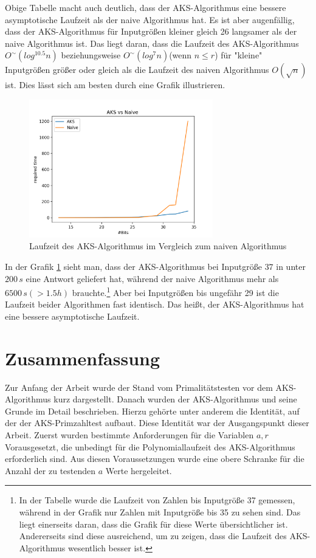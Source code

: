 \documentclass[12pt,oneside]{article}
\theoremstyle{remark}
\theoremstyle{definition}
\begin{document}
Obige Tabelle macht auch deutlich, dass der AKS-Algorithmus eine bessere asymptotische Laufzeit als der naive Algorithmus hat. Es ist aber augenfällig, dass der AKS-Algorithmus für Inputgrößen kleiner gleich 26 langsamer als der naive Algorithmus ist. Das liegt daran, dass die Laufzeit des AKS-Algorithmus $O^{\sim}(log^{10.5}n)$ beziehungsweise $O^{\sim}(log^7n)$(wenn $n \leq r$) für "kleine" $ $ Inputgrößen größer oder gleich als die Laufzeit des naiven Algorithmus $O(\sqrt{n})$ ist. Dies lässt sich am besten durch eine Grafik illustrieren. 


\begin{figure}[h]
\includegraphics[width=8cm]{plots/aksVsNaive.png}
\centering
\caption{Laufzeit des AKS-Algorithmus im Vergleich zum naiven Algorithmus}
\label{plot_aks_naive}
\end{figure}

In der Grafik \ref{plot_aks_naive} sieht man, dass der AKS-Algorithmus bei Inputgröße $37$ in unter $200 \, s$ eine Antwort geliefert hat, während der naive Algorithmus mehr als $6500 \, s(> 1.5 h)$ brauchte.\footnote{In der Tabelle wurde die Laufzeit von Zahlen bis Inputgröße 37 gemessen, während in der Grafik nur Zahlen mit Inputgröße bis 35 zu sehen sind. Das liegt  einerseits daran, dass die Grafik für diese Werte übersichtlicher ist. Andererseits sind diese ausreichend, um zu zeigen, dass die Laufzeit des AKS-Algorithmus wesentlich besser ist.} Aber bei Inputgrößen bis ungefähr 29 ist die Laufzeit beider Algorithmen fast identisch. Das heißt, der AKS-Algorithmus hat eine bessere asymptotische Laufzeit. 

\newpage

\section{Zusammenfassung}
Zur Anfang der Arbeit wurde der Stand vom Primalitätstesten vor dem AKS-Algorithmus kurz dargestellt. Danach wurden der AKS-Algorithmus und seine Grunde im Detail beschrieben. Hierzu gehörte unter anderem die Identität, auf der der AKS-Primzahltest aufbaut. Diese Identität war der Ausgangspunkt dieser Arbeit. Zuerst wurden bestimmte Anforderungen für die Variablen $a,r$ Vorausgesetzt, die unbedingt für die Polynomiallaufzeit des AKS-Algorithmus erforderlich sind. Aus diesen Voraussetzungen wurde eine obere Schranke für die Anzahl der zu testenden $a$ Werte hergeleitet.
\end{document}
